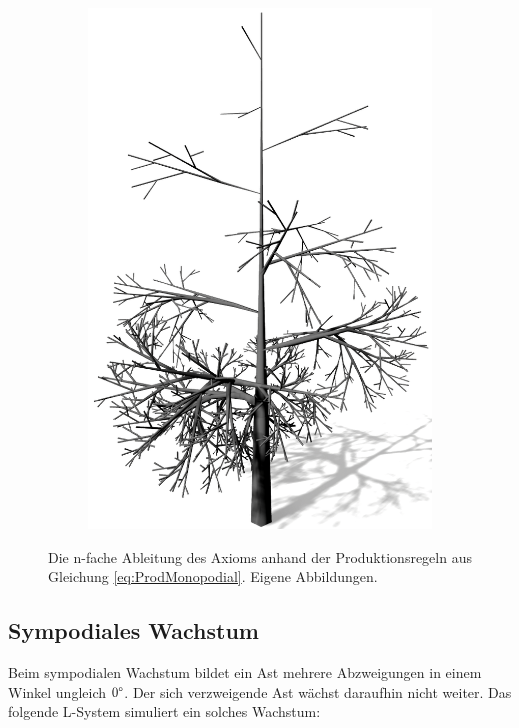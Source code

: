 \begin{figure} [hbtp]
\begin{subfigure}[t]{.45\textwidth}
		\caption{}
		\label{subfig:LS_Monopodial_3}
	\end{subfigure}
	\begin{subfigure}[t]{.45\textwidth}
		\centering
		\includegraphics[height=.21\textheight]{images/LS_Monopodial_4.png}
		\caption{}
		\label{subfig:LS_Monopodial_4}
	\end{subfigure}
	\caption{Die n-fache Ableitung des Axioms anhand der Produktionsregeln aus Gleichung \ref{eq:ProdMonopodial}. Eigene Abbildungen.}
	\label{fig:LS_Monopodial}
\end{figure}

\subsection{Sympodiales Wachstum}
Beim sympodialen Wachstum bildet ein Ast mehrere Abzweigungen in einem Winkel ungleich $0\degree$. Der sich verzweigende Ast wächst daraufhin nicht weiter. \cite[S.21]{Forstbonatik:17} \cite[S.58]{ABOP:04} Das folgende L-System simuliert ein solches Wachstum:

